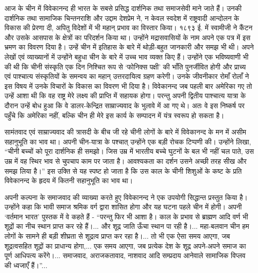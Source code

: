 
आज के चीन में विवेकानन्द ही भारत के सबसे प्रसिद्ध दार्शनिक तथा समाजसेवी माने जाते हैं। उनकी दार्शनिक तथा सामाजिक चिन्तनराशि और उद्दाम देशप्रेम ने, न केवल स्वदेश में राष्ट्रवादी आन्दोलन के विकास की प्रेरणा दी, अपितु विदेशों में भी महान् प्रभाव का विस्तार किया। १८९३ ई. में स्वामीजी ने कैंटन और उसके आसपास के क्षेत्रों का परिदर्शन किया था। उन्होंने मद्रासवासियों के नाम अपने एक पत्र में इस भ्रमण का विवरण दिया है। उन्हें चीन में इतिहास के बारे में थोड़ी-बहुत जानकारी और समझ भी थी। अपने लेखों एवं व्याख्यानों में उन्होंने बहुधा चीन के बारे में उच्च भाव व्यक्त किए हैं। उन्होंने एक भविष्यवाणी भी की थी कि चीनी संस्कृति एक दिन निश्चित रूप से ‘फोनिक्स पक्षी’ की भाँति पुनर्जीवित होगी और प्राच्य एवं पाश्चात्य संस्कृतियों के समन्वय का महान् उत्तरदायित्व ग्रहण करेगी। उनके जीवनीकार रोमाँ रोलाँ ने इस विषय में उनके विचारों के विकास का विवरण भी दिया है। विवेकानन्द जब पहली बार अमेरिका गए तो उन्हें आशा थी कि वह राष्ट्र मेरे लक्ष्य की प्राप्ति में सहायक होगा। परन्तु अपनी द्वितीय पाश्चात्य यात्रा के दौरान उन्हें बोध हुआ कि वे डालर-केन्द्रित साम्राज्यवाद के भुलावे में आ गए थे। अतः वे इस निष्कर्ष पर पहुँचे कि अमेरिका नहीं, बल्कि चीन ही मेरे इस कार्य के सम्पादन में यंत्र स्वरूप हो सकता है। 

सामंतवाद एवं साम्राज्यवाद की त्रासदी के बीच जी रहे चीनी लोगों के बारे में विवेकानन्द के मन में असीम सहानुभूति का भाव था। अपनी चीन-यात्रा के पश्चात् उन्होंने एक बड़ी रोचक टिप्पणी की। उन्होंने लिखा, “चीनी बच्चों को पूरा दार्शनिक ही समझो। जिस उम्र में भारतीय बच्चे घुटनों के बल भी नहीं चल पाते, उस उम्र में वह स्थिर भाव से चुपचाप काम पर जाता है। आवश्यकता का दर्शन उसने अच्छी तरह सीख और समझ लिया है।” इस उक्ति से यह स्पष्ट हो जाता है कि उस काल के चीनी शिशुओं के कष्ट के प्रति विवेकानन्द के हृदय में कितनी सहानुभूति का भाव था। 

अपनी कल्पना के समाजवाद की व्याख्या करते हुए विवेकानन्द ने एक उपयोगी सिद्धान्त प्रस्तुत किया है। उन्होंने कहा कि भावी समाज श्रमिक वर्ग द्वारा शासित होगा और यह घटना पहले चीन में होगी। अपनी ‘वर्तमान भारत’ पुस्तक में वे कहते हैं - “परन्तु फिर भी आशा है। काल के प्रभाव से ब्राह्मण आदि वर्ण भी शूद्रों का नीच स्थान प्राप्त कर रहे हैं।... और शूद्र जाति ऊँचा स्थान पा रही है।... महा-बलवान चीन हम लोगों के सामने ही बड़ी शीघ्रता से शूद्रत्व प्राप्त कर रहा है।... तो भी एक ऐसा समय आएगा, जब शूद्रत्वसहित शूद्रों का प्राधान्य होगा,... एक समय आएगा, जब प्रत्येक देश के शूद्र अपने-अपने समाज का पूर्ण आधिपत्य करेंगे।... समाजवाद, अराजकतावाद, नाशवाद आदि सम्प्रदाय आनेवाले सामाजिक विप्लव की ध्वजाएँ हैं।”... 

